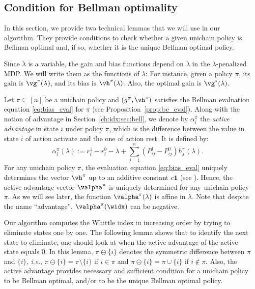 \subsection{Condition for Bellman optimality}
In this section, we provide two technical lemmas that we will use in our algorithm. %
They provide conditions to check whether a given unichain policy is Bellman optimal and, if so, whether it is the unique Bellman optimal policy.

Since $\lambda$ is a variable, the gain and bias functions depend on $\lambda$ in the $\lambda$-penalized MDP.
We will write them as the functions of $\lambda$: For instance, given a policy $\pi$, its gain is $\vg^\pi(\lambda)$, and its bias is $\vh^\pi(\lambda)$. Also, the optimal gain is $\vg^*(\lambda)$.

Let $\pi\subseteq[n]$ be a unichain policy and $(g^\pi, \vh^\pi)$ satisfies the Bellman evaluation equation \eqref{eq:bias_eval} for $\pi$ (see Proposition~\ref{prop:be_eval}).
Along with the notion of advantage in Section~\ref{ch:idx:sec:bell}, we denote by $\alpha^{\pi}_i$ the \emph{active advantage} in state $i$ under policy $\pi$, which is the difference between the value in state $i$ of action activate and the one of action rest.
It is defined by:
\begin{equation}
    \label{eq:advantage}
    \alpha^\pi_i(\lambda):=r^1_i -r^0_i -\lambda +\sum_{j=1}^n (P^1_{ij} -P^0_{ij})h^\pi_j(\lambda).
\end{equation}
For any unichain policy $\pi$, the evaluation equation \eqref{eq:bias_eval} uniquely determines the vector $\vh^\pi$ up to an additive constant $c\mathbf{1}$ (see \cite[Chapter 8]{puterman2014markov}).
Hence, the active advantage vector $\valpha^\pi$ is uniquely determined for any unichain policy $\pi$.
As we will see later, the function $\valpha^\pi(\lambda)$ is affine in $\lambda$.
Note that despite the name ``advantage'', $\valpha^{\pi}(\widx)$ can be negative.

Our algorithm computes the Whittle index in increasing order by trying to eliminate states one by one.
The following lemma shows that to identify the next state to eliminate, one should look at when the active advantage of the active state equals $0$.
In this lemma, $\pi\ominus\{i\}$ denotes the symmetric difference between $\pi$ and $\{i\}$, \emph{i.e.}, $\pi\ominus\{i\}=\pi\setminus\{i\}$ if $i\in\pi$ and $\pi\ominus\{i\}=\pi\cup\{i\}$ if $i\not\in\pi$.
Also, the active advantage provides necessary and sufficient condition for a unichain policy to be Bellman optimal, and/or to be the unique Bellman optimal policy. %

